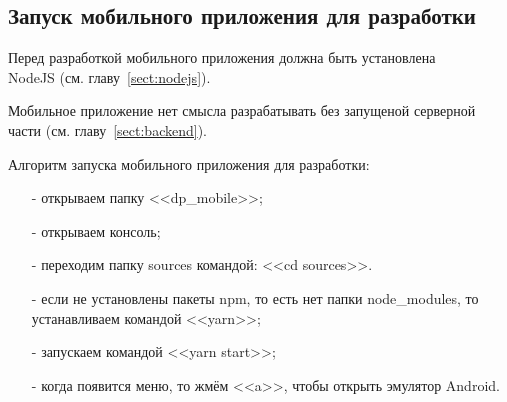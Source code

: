 \subsection{Запуск мобильного приложения для разработки}

Перед разработкой мобильного приложения должна быть установлена\\ NodeJS (см. главу~\ref{sect:nodejs}).

Мобильное приложение нет смысла разрабатывать без запущеной серверной части (см. главу~\ref{sect:backend}).

Алгоритм запуска мобильного приложения для разработки:
\begin{enumerate}
    \item[-] открываем папку <<dp\_mobile>>;
    \item[-] открываем консоль;
    \item[-] переходим папку sources командой: <<cd sources>>.
    \item[-] если не установлены пакеты npm, то есть нет папки node\_modules, то устанавливаем командой <<yarn>>;
    \item[-] запускаем командой <<yarn start>>;
    \item[-] когда появится меню, то жмём <<a>>, чтобы открыть эмулятор Android.
\end{enumerate}
